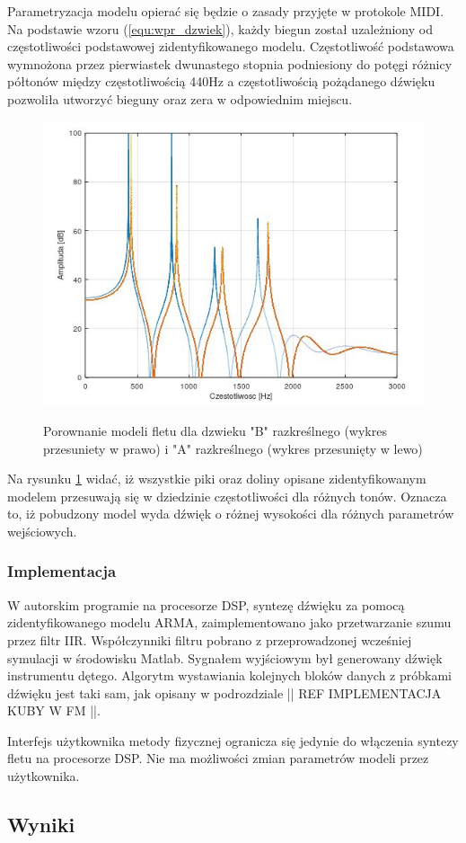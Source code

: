 Parametryzacja modelu opierać się będzie o zasady przyjęte w protokole MIDI. 
Na podstawie wzoru (\ref{equ:wpr_dzwiek}), każdy biegun został uzależniony od częstotliwości podstawowej zidentyfikowanego modelu. Częstotliwość podstawowa wymnożona przez pierwiastek dwunastego stopnia podniesiony do potęgi różnicy półtonów między częstotliwością 440Hz a częstotliwością pożądanego dźwięku pozwoliła utworzyć bieguny oraz zera w odpowiednim miejscu.
\begin{figure}[H]
	\centering
	\includegraphics[width=12cm]{grafiki/Model_B_A}
	\label{rys:por_mod_flet}
	\captionsetup{justification=centering}
	\caption{Porownanie modeli fletu dla dzwieku "B" razkreślnego (wykres przesuniety w prawo) i "A" razkreślnego (wykres przesunięty w lewo)}
	\label{rys:por_mod_flet}
\end{figure}
Na rysunku \ref{rys:por_mod_flet} widać, iż wszystkie piki oraz doliny opisane zidentyfikowanym modelem przesuwają się w dziedzinie częstotliwości dla różnych tonów. Oznacza to, iż pobudzony model wyda dźwięk o różnej wysokości dla różnych parametrów wejściowych.


\subsubsection{Implementacja}
W autorskim programie na procesorze DSP, syntezę dźwięku za pomocą zidentyfikowanego modelu ARMA, zaimplementowano jako przetwarzanie szumu przez filtr IIR. Współczynniki filtru pobrano z przeprowadzonej wcześniej symulacji w środowisku Matlab. Sygnałem wyjściowym był generowany dźwięk instrumentu dętego.
Algorytm wystawiania kolejnych bloków danych z próbkami dźwięku jest taki sam, jak opisany w podrozdziale || REF IMPLEMENTACJA KUBY W FM ||.

Interfejs użytkownika metody fizycznej ogranicza się jedynie do włączenia syntezy fletu na procesorze DSP. Nie ma możliwości zmian parametrów modeli przez użytkownika.

\subsection{Wyniki}

